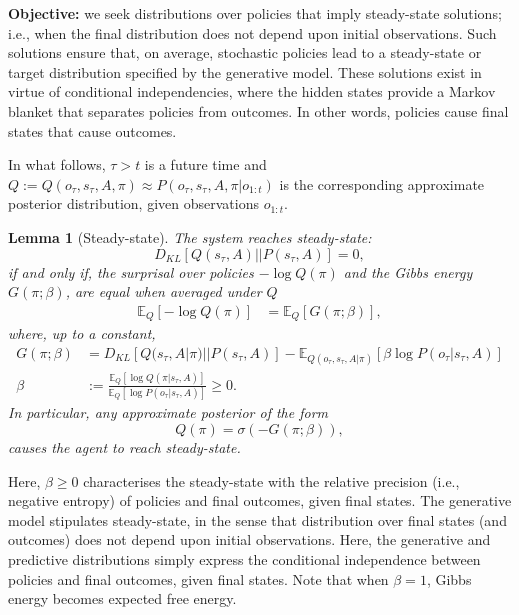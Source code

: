 \documentclass[review,12pt,authoryear]{elsarticle}
\newtheorem{lemma}[theorem]{Lemma}
\begin{document}
\textbf{Objective:} we seek distributions over policies that imply steady-state solutions; i.e., when the final distribution does not depend upon initial observations. Such solutions ensure that, on average, stochastic policies lead to a steady-state or target distribution specified by the generative model. These solutions exist in virtue of conditional independencies, where the hidden states provide a Markov blanket that separates policies from outcomes. In other words, policies cause final states that cause outcomes.

In what follows, $\tau >t$ is a future time and $Q:=Q(o_\tau, s_\tau, A, \pi) \approx P(o_\tau, s_\tau, A, \pi|o_{1:t})$ is the corresponding approximate posterior distribution, given observations $o_{1:t}$.

\begin{lemma}[Steady-state]
\label{lemma:steady-state}
The system reaches steady-state: 
\begin{equation*}
    D_{KL}[Q(s_\tau, A) ||P(s_\tau, A)]=0,
\end{equation*}
 if and only if, the surprisal over policies $-\log Q(\pi)$ and the Gibbs energy $G(\pi; \beta)$, are equal when averaged under $Q$
\begin{align*}
    \mathbb E_Q[-\log Q(\pi)]&= \mathbb E_Q[G(\pi; \beta)],
\end{align*}
where, up to a constant,
\begin{align*}
    G(\pi; \beta) &= D_{KL}[Q(s_\tau, A|\pi)||P(s_\tau,A)]-\mathbb E_{Q(o_\tau, s_\tau, A|\pi)} [\beta \log P(o_\tau |s_\tau, A)] \\
    \beta &:= \frac{\mathbb E_Q[\log Q(\pi|s_\tau,A)]}{\mathbb E_Q[\log P(o_\tau|s_\tau,A)]} \geq 0.
\end{align*}
In particular, any approximate posterior of the form 
\begin{equation*}
    Q(\pi) = \sigma(- G(\pi; \beta)), 
\end{equation*}
causes the agent to reach steady-state.
\end{lemma}

Here, $\beta \geq 0$ characterises the steady-state with the relative precision (i.e., negative entropy) of policies and final outcomes, given final states. The generative model stipulates steady-state, in the sense that distribution over final states (and outcomes) does not depend upon initial observations. Here, the generative and predictive distributions simply express the conditional independence between policies and final outcomes, given final states. Note that when $\beta = 1$, Gibbs energy becomes expected free energy.
\end{document}
